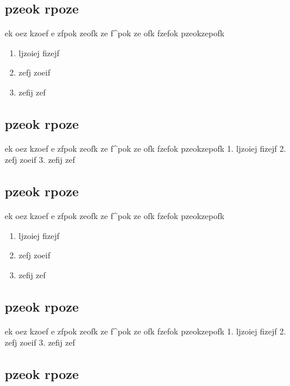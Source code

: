 \documentclass[
]{book}
\providecommand{\tightlist}{%
  \setlength{\itemsep}{0pt}\setlength{\parskip}{0pt}}
\def\tightlist{}
\begin{document}
\begin{blackbox}
\hypertarget{pzeok-rpoze-2}{%
\subsection{pzeok rpoze}\label{pzeok-rpoze-2}}

ek oez kzoef
e zfpok zeofk
ze f\^{}pok ze ofk
fzefok pzeokzepofk

\begin{enumerate}
\def\labelenumi{\arabic{enumi}.}
\tightlist
\item
  ljzoiej fizejf
\item
  zefj zoeif
\item
  zefij zef
\end{enumerate}

\hypertarget{pzeok-rpoze-3}{%
\subsection{pzeok rpoze}\label{pzeok-rpoze-3}}

ek oez kzoef
e zfpok zeofk
ze f\^{}pok ze ofk
fzefok pzeokzepofk
1. ljzoiej fizejf
2. zefj zoeif
3. zefij zef

\hypertarget{pzeok-rpoze-4}{%
\subsection{pzeok rpoze}\label{pzeok-rpoze-4}}

ek oez kzoef
e zfpok zeofk
ze f\^{}pok ze ofk
fzefok pzeokzepofk

\begin{enumerate}
\def\labelenumi{\arabic{enumi}.}
\tightlist
\item
  ljzoiej fizejf
\item
  zefj zoeif
\item
  zefij zef
\end{enumerate}

\hypertarget{pzeok-rpoze-5}{%
\subsection{pzeok rpoze}\label{pzeok-rpoze-5}}

ek oez kzoef
e zfpok zeofk
ze f\^{}pok ze ofk
fzefok pzeokzepofk
1. ljzoiej fizejf
2. zefj zoeif
3. zefij zef

\hypertarget{pzeok-rpoze-6}{%
\subsection{pzeok rpoze}\label{pzeok-rpoze-6}}


\end{blackbox}
\end{document}
